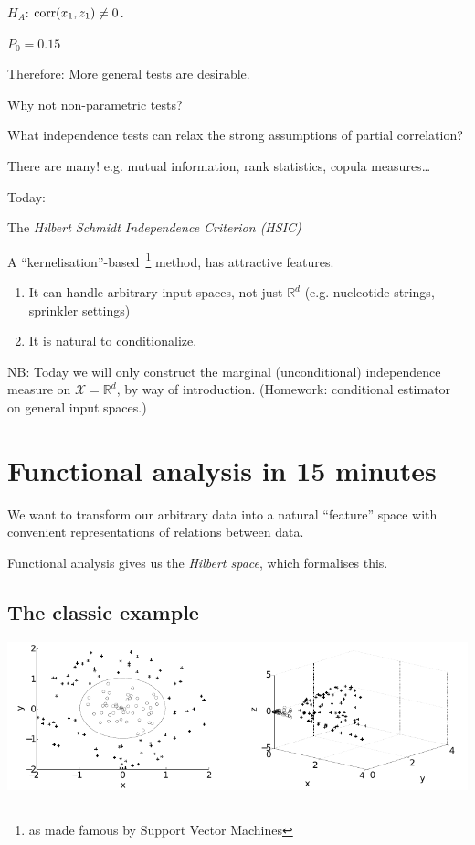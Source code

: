$H_A$: $\operatorname*{corr}(x_1, z_1)\ne0$.

$P_0 = 0.15$
\clearpage

Therefore: More general tests are desirable.

Why not non-parametric tests?

\clearpage

What independence tests can relax the strong assumptions of partial correlation?

There are many! e.g. mutual information, rank statistics, copula measures\ldots

\clearpage
Today:

The \emph{Hilbert Schmidt Independence Criterion (HSIC)}

A ``kernelisation''-based~\footnote{as made famous by Support Vector Machines} method, has attractive features.
\begin{enumerate}
\item It can handle arbitrary input spaces, not just $\mathbb{R}^d$ (e.g. nucleotide strings, sprinkler settings)
\item It is natural to conditionalize.
\end{enumerate}
\clearpage
NB: Today we will only construct the marginal (unconditional) independence measure on $\mathcal{X}=\mathbb{R}^d$, by way of introduction. (Homework: conditional estimator on general input spaces.)

\clearpage
\section{Functional analysis in 15 minutes}
We want to transform our arbitrary data into a natural ``feature'' space with convenient representations of relations between data.

Functional analysis gives us the \emph{Hilbert space}, which formalises this.

\clearpage
\subsection*{The classic example}

    \includegraphics[width=\textwidth]{diploma_separation_diagrams.pdf}
    
